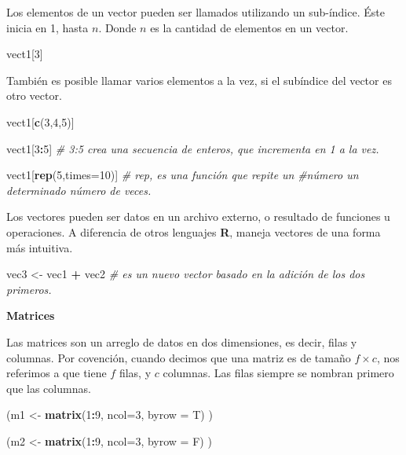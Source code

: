 \documentclass[12pt,letterpaper,]{book}
\newenvironment{Shaded}{\begin{snugshade}}{\end{snugshade}}
\newcommand{\KeywordTok}[1]{\textcolor[rgb]{0.13,0.29,0.53}{\textbf{#1}}}
\newcommand{\DataTypeTok}[1]{\textcolor[rgb]{0.13,0.29,0.53}{#1}}
\newcommand{\DecValTok}[1]{\textcolor[rgb]{0.00,0.00,0.81}{#1}}
\newcommand{\StringTok}[1]{\textcolor[rgb]{0.31,0.60,0.02}{#1}}
\newcommand{\CommentTok}[1]{\textcolor[rgb]{0.56,0.35,0.01}{\textit{#1}}}
\newcommand{\OperatorTok}[1]{\textcolor[rgb]{0.81,0.36,0.00}{\textbf{#1}}}
\newcommand{\NormalTok}[1]{#1}
\begin{document}
Los elementos de un vector pueden ser llamados utilizando un sub-índice.
Éste inicia en 1, hasta \(n\). Donde \(n\) es la cantidad de elementos
en un vector.

\begin{Shaded}
\begin{Highlighting}[]
\NormalTok{vect1[}\DecValTok{3}\NormalTok{]}
\end{Highlighting}
\end{Shaded}

También es posible llamar varios elementos a la vez, si el subíndice del
vector es otro vector.

\begin{Shaded}
\begin{Highlighting}[]
\NormalTok{vect1[}\KeywordTok{c}\NormalTok{(}\DecValTok{3}\NormalTok{,}\DecValTok{4}\NormalTok{,}\DecValTok{5}\NormalTok{)]}

\NormalTok{vect1[}\DecValTok{3}\OperatorTok{:}\DecValTok{5}\NormalTok{] }
\CommentTok{# 3:5 crea una secuencia de enteros, que incrementa en 1 a la vez.}

\NormalTok{vect1[}\KeywordTok{rep}\NormalTok{(}\DecValTok{5}\NormalTok{,}\DataTypeTok{times=}\DecValTok{10}\NormalTok{)] }\CommentTok{# rep, es una función que repite un}
\CommentTok{#número un determinado número de veces.}
\end{Highlighting}
\end{Shaded}

Los vectores pueden ser datos en un archivo externo, o resultado de
funciones u operaciones. A diferencia de otros lenguajes \textbf{R},
maneja vectores de una forma más intuitiva.

\begin{Shaded}
\begin{Highlighting}[]
\NormalTok{vec3 <-}\StringTok{ }\NormalTok{vec1 }\OperatorTok{+}\StringTok{ }\NormalTok{vec2 }\CommentTok{# es un nuevo vector basado en la adición de los dos primeros.}
\end{Highlighting}
\end{Shaded}

\textbf{Matrices}

Las matrices son un arreglo de datos en dos dimensiones, es decir, filas
y columnas. Por covención, cuando decimos que una matriz es de tamaño
\(f\times c\), nos referimos a que tiene \(f\) filas, y \(c\) columnas.
Las filas siempre se nombran primero que las columnas.

\begin{Shaded}
\begin{Highlighting}[]
\NormalTok{(m1 <-}\StringTok{ }\KeywordTok{matrix}\NormalTok{(}\DecValTok{1}\OperatorTok{:}\DecValTok{9}\NormalTok{, }\DataTypeTok{ncol=}\DecValTok{3}\NormalTok{, }\DataTypeTok{byrow =}\NormalTok{ T) )}

\NormalTok{(m2 <-}\StringTok{ }\KeywordTok{matrix}\NormalTok{(}\DecValTok{1}\OperatorTok{:}\DecValTok{9}\NormalTok{, }\DataTypeTok{ncol=}\DecValTok{3}\NormalTok{, }\DataTypeTok{byrow =}\NormalTok{ F) )}
\end{Highlighting}
\end{Shaded}
\end{document}
